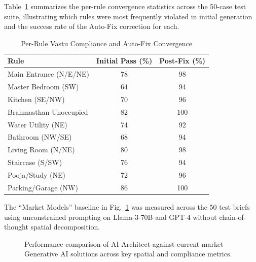 \documentclass[10pt, twocolumn, letterpaper]{article}
\begin{document}
Table~\ref{tab:vastu_results} summarizes the per-rule convergence statistics
across the 50-case test suite, illustrating which rules were most frequently
violated in initial generation and the success rate of the Auto-Fix correction
for each.

\begin{table}[ht]
\caption{Per-Rule Vastu Compliance and Auto-Fix Convergence}
\label{tab:vastu_results}
\centering
\fontsize{8}{10}\selectfont
\renewcommand{\arraystretch}{1.2}
\begin{tabular}{@{}p{1.3in}cc@{}}
\toprule
\textbf{Rule} & \textbf{Initial Pass (\%)} & \textbf{Post-Fix (\%)} \\
\midrule
Main Entrance (N/E/NE)    & 78 & 98 \\
Master Bedroom (SW)       & 64 & 94 \\
Kitchen (SE/NW)           & 70 & 96 \\
Brahmasthan Unoccupied    & 82 & 100 \\
Water Utility (NE)        & 74 & 92 \\
Bathroom (NW/SE)          & 68 & 94 \\
Living Room (N/NE)        & 80 & 98 \\
Staircase (S/SW)          & 76 & 94 \\
Pooja/Study (NE)          & 72 & 96 \\
Parking/Garage (NW)       & 86 & 100 \\
\bottomrule
\end{tabular}
\end{table}

The ``Market Models'' baseline in Fig.~\ref{fig:comparison_graph} was measured across the 50 test briefs using unconstrained prompting on Llama-3-70B and GPT-4 without chain-of-thought spatial decomposition.

\begin{figure}[ht]
  \centering
  \caption{Performance comparison of AI Architect against current market Generative AI solutions across key spatial and compliance metrics.}
  \label{fig:comparison_graph}
\end{figure}
\end{document}
